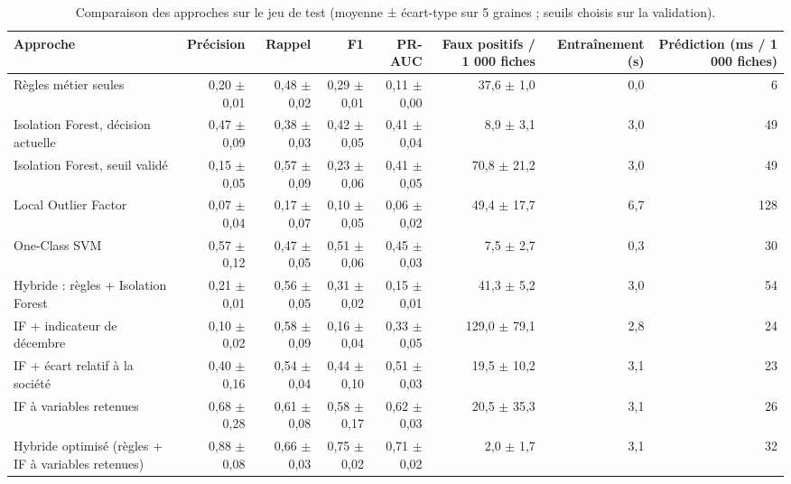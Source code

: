 \begin{table}[htbp]
\centering
\caption{Comparaison des approches sur le jeu de test (moyenne ± écart-type sur 5 graines ; seuils choisis sur la validation).}
\label{tab:comparaison_approches}
\small
\begin{tabular}{p{4.6cm}rrrrrrr}
\toprule
\textbf{Approche} & \textbf{Précision} & \textbf{Rappel} & \textbf{F1} & \textbf{PR-AUC} & \textbf{Faux positifs / 1 000 fiches} & \textbf{Entraînement (s)} & \textbf{Prédiction (ms / 1 000 fiches)} \\
\midrule
Règles métier seules & 0,20 $\pm$ 0,01 & 0,48 $\pm$ 0,02 & 0,29 $\pm$ 0,01 & 0,11 $\pm$ 0,00 & 37,6 $\pm$ 1,0 & 0,0 & 6 \\
Isolation Forest, décision actuelle & 0,47 $\pm$ 0,09 & 0,38 $\pm$ 0,03 & 0,42 $\pm$ 0,05 & 0,41 $\pm$ 0,04 & 8,9 $\pm$ 3,1 & 3,0 & 49 \\
Isolation Forest, seuil validé & 0,15 $\pm$ 0,05 & 0,57 $\pm$ 0,09 & 0,23 $\pm$ 0,06 & 0,41 $\pm$ 0,05 & 70,8 $\pm$ 21,2 & 3,0 & 49 \\
Local Outlier Factor & 0,07 $\pm$ 0,04 & 0,17 $\pm$ 0,07 & 0,10 $\pm$ 0,05 & 0,06 $\pm$ 0,02 & 49,4 $\pm$ 17,7 & 6,7 & 128 \\
One-Class SVM & 0,57 $\pm$ 0,12 & 0,47 $\pm$ 0,05 & 0,51 $\pm$ 0,06 & 0,45 $\pm$ 0,03 & 7,5 $\pm$ 2,7 & 0,3 & 30 \\
Hybride : règles + Isolation Forest & 0,21 $\pm$ 0,01 & 0,56 $\pm$ 0,05 & 0,31 $\pm$ 0,02 & 0,15 $\pm$ 0,01 & 41,3 $\pm$ 5,2 & 3,0 & 54 \\
IF + indicateur de décembre & 0,10 $\pm$ 0,02 & 0,58 $\pm$ 0,09 & 0,16 $\pm$ 0,04 & 0,33 $\pm$ 0,05 & 129,0 $\pm$ 79,1 & 2,8 & 24 \\
IF + écart relatif à la société & 0,40 $\pm$ 0,16 & 0,54 $\pm$ 0,04 & 0,44 $\pm$ 0,10 & 0,51 $\pm$ 0,03 & 19,5 $\pm$ 10,2 & 3,1 & 23 \\
IF à variables retenues & 0,68 $\pm$ 0,28 & 0,61 $\pm$ 0,08 & 0,58 $\pm$ 0,17 & 0,62 $\pm$ 0,03 & 20,5 $\pm$ 35,3 & 3,1 & 26 \\
Hybride optimisé (règles + IF à variables retenues) & 0,88 $\pm$ 0,08 & 0,66 $\pm$ 0,03 & 0,75 $\pm$ 0,02 & 0,71 $\pm$ 0,02 & 2,0 $\pm$ 1,7 & 3,1 & 32 \\
\bottomrule
\end{tabular}
\end{table}
